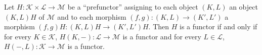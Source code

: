 Let $H: \mathcal{K} \times \mathcal{L} \rightarrow \mathcal{M}$ be a ``prefunctor'' assigning to each object $(K, L)$ an object $(K, L)H$ of $\mathcal{M}$ and to each morphism $(f, g): (K, L) \rightarrow (K', L')$ a morphism $(f, g)H: (K, L)H \rightarrow (K', L')H$. Then $H$ is a functor if and only if for every $K \in \mathcal{K}$, $H(K, -): \mathcal{L} \rightarrow \mathcal{M}$ is a functor and for every $L \in \mathcal{L}$, $H(-, L): \mathcal{K} \rightarrow \mathcal{M}$ is a functor.
